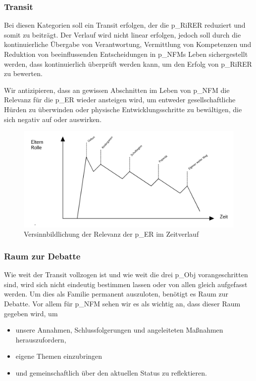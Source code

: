 \subsubsection{Transit}
Bei diesen Kategorien soll ein Transit erfolgen, der die \gls{p_RiRER} reduziert und somit zu  beiträgt. Der Verlauf wird nicht linear erfolgen, jedoch soll durch die kontinuierliche Übergabe von Verantwortung, Vermittlung von Kompetenzen und Reduktion von beeinflussenden Entscheidungen in \gls{p_NFM}s Leben sichergestellt werden, dass  kontinuierlich überprüft werden kann, um den Erfolg von \gls{p_RiRER} zu bewerten. 

Wir antizipieren, dass an gewissen Abschnitten im Leben von \gls{p_NFM} die Relevanz für die \gls{p_ER} wieder ansteigen wird, um entweder gesellschaftliche Hürden zu überwinden oder physische Entwicklungsschritte zu bewältigen, die sich negativ auf  oder \NFMOTwo auswirken.

\begin{figure}[H]
	\centering
	\includegraphics[scale = 0.3]{attachment/chapter_OWN/Scc005.png}
	\caption{Versinnbildlichung der Relevanz der \gls{p_ER} im Zeitverlauf}
\end{figure} 

\subsubsection{Raum zur Debatte} 
Wie weit der Transit vollzogen ist und wie weit die drei \gls{p_Obj} vorangeschritten sind, wird sich nicht eindeutig bestimmen lassen oder von allen gleich aufgefasst werden. Um dies als Familie permanent auszuloten, benötigt es Raum zur Debatte. Vor allem für \gls{p_NFM} sehen wir es als wichtig an, dass dieser Raum gegeben wird, um
\begin{itemize}
	\item unsere Annahmen, Schlussfolgerungen und angeleiteten Maßnahmen herauszufordern, 
	\item eigene Themen einzubringen
	\item und gemeinschaftlich über den aktuellen Status zu reflektieren.
\end{itemize}

